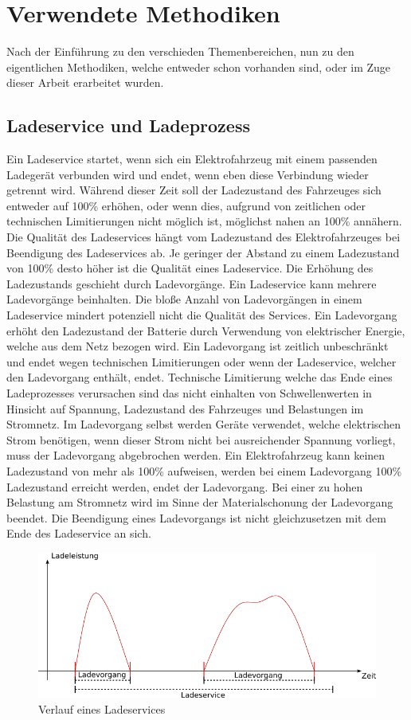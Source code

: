 \chapter{Verwendete Methodiken}
Nach der Einführung zu den verschieden Themenbereichen, nun zu den eigentlichen Methodiken, welche entweder schon vorhanden sind, oder im Zuge dieser Arbeit erarbeitet wurden.
\section{Ladeservice und Ladeprozess}
Ein Ladeservice startet, wenn sich ein Elektrofahrzeug mit einem passenden Ladegerät verbunden wird und endet, wenn eben diese Verbindung wieder getrennt wird. Während dieser Zeit soll der Ladezustand des Fahrzeuges sich entweder auf 100\% erhöhen, oder wenn dies, aufgrund von zeitlichen oder technischen Limitierungen nicht möglich ist, möglichst nahen an 100\% annähern. Die Qualität des Ladeservices hängt vom Ladezustand des Elektrofahrzeuges bei Beendigung des Ladeservices ab. Je geringer der Abstand zu einem Ladezustand von 100\% desto höher ist die Qualität eines Ladeservice. Die Erhöhung des Ladezustands geschieht durch Ladevorgänge. Ein Ladeservice kann mehrere Ladevorgänge beinhalten. Die bloße Anzahl von Ladevorgängen in einem Ladeservice mindert potenziell nicht die Qualität des Services. Ein Ladevorgang erhöht den Ladezustand der Batterie durch Verwendung von elektrischer Energie, welche aus dem Netz bezogen wird. Ein Ladevorgang ist zeitlich unbeschränkt und endet wegen technischen Limitierungen oder wenn der Ladeservice, welcher den Ladevorgang enthält, endet. Technische Limitierung welche das Ende eines Ladeprozesses verursachen sind das nicht einhalten von Schwellenwerten in Hinsicht auf Spannung, Ladezustand des Fahrzeuges und Belastungen im Stromnetz. Im Ladevorgang selbst werden Geräte verwendet, welche elektrischen Strom benötigen, wenn dieser Strom nicht bei ausreichender Spannung vorliegt, muss der Ladevorgang abgebrochen werden. Ein Elektrofahrzeug kann keinen Ladezustand von mehr als 100\% aufweisen, werden bei einem Ladevorgang 100\% Ladezustand erreicht werden, endet der Ladevorgang. Bei einer zu hohen Belastung am Stromnetz wird im Sinne der Materialschonung der Ladevorgang beendet. Die Beendigung eines Ladevorgangs ist nicht gleichzusetzen mit dem Ende des Ladeservice an sich. 
\begin{figure}[tb]
	\includegraphics[width=\linewidth]{img/Ladeservice.png}
	\caption{Verlauf eines Ladeservices}
	\label{Abb_Ladeservice}
\end{figure}

